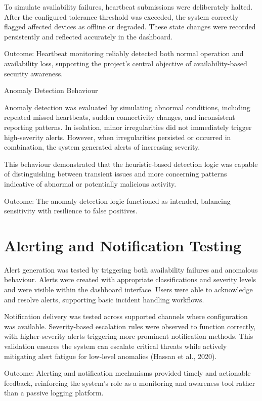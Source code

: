 To simulate availability failures, heartbeat submissions were deliberately halted. After the configured tolerance threshold was exceeded, the system correctly flagged affected devices as offline or degraded. These state changes were recorded persistently and reflected accurately in the dashboard.

Outcome: Heartbeat monitoring reliably detected both normal operation and availability loss, supporting the project's central objective of availability-based security awareness.

Anomaly Detection Behaviour

Anomaly detection was evaluated by simulating abnormal conditions, including repeated missed heartbeats, sudden connectivity changes, and inconsistent reporting patterns. In isolation, minor irregularities did not immediately trigger high-severity alerts. However, when irregularities persisted or occurred in combination, the system generated alerts of increasing severity.

This behaviour demonstrated that the heuristic-based detection logic was capable of distinguishing between transient issues and more concerning patterns indicative of abnormal or potentially malicious activity.

Outcome: The anomaly detection logic functioned as intended, balancing sensitivity with resilience to false positives.

\section{Alerting and Notification Testing}

Alert generation was tested by triggering both availability failures and anomalous behaviour. Alerts were created with appropriate classifications and severity levels and were visible within the dashboard interface. Users were able to acknowledge and resolve alerts, supporting basic incident handling workflows.

Notification delivery was tested across supported channels where configuration was available. Severity-based escalation rules were observed to function correctly, with higher-severity alerts triggering more prominent notification methods. This validation ensures the system can escalate critical threats while actively mitigating alert fatigue for low-level anomalies (Hassan et al., 2020).

Outcome: Alerting and notification mechanisms provided timely and actionable feedback, reinforcing the system's role as a monitoring and awareness tool rather than a passive logging platform.

